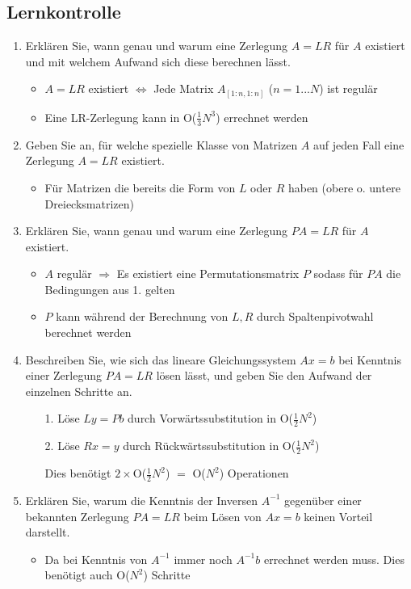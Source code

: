 \documentclass[]{article}
\begin{document}
\subsection{Lernkontrolle}
	\begin{enumerate}
		\item Erklären Sie, wann genau und warum eine Zerlegung $A=LR$ für $A$ existiert und mit welchem Aufwand sich diese berechnen lässt.
			\begin{itemize}
				\item $A = LR$ existiert $\Leftrightarrow$ Jede Matrix $A_{[1:n,1:n]}$ ($n = 1...N$) ist regulär
				\item Eine LR-Zerlegung kann in O($\frac{1}{3} N^3$) errechnet werden
			\end{itemize}
		\item Geben Sie an, für welche spezielle Klasse von Matrizen $A$ auf jeden Fall eine Zerlegung $A=LR$ existiert.
			\begin{itemize}
				\item Für Matrizen die bereits die Form von $L$ oder $R$ haben (obere o. untere Dreiecksmatrizen)
			\end{itemize}
		\item Erklären Sie, wann genau und warum eine Zerlegung $PA=LR$ für $A$ existiert.
			\begin{itemize}
				\item $A$ regulär $\Rightarrow$ Es existiert eine Permutationsmatrix $P$ sodass für $PA$ die Bedingungen aus 1. gelten
				\item $P$ kann während der Berechnung von $L, R$ durch Spaltenpivotwahl berechnet werden
			\end{itemize}
		\item Beschreiben Sie, wie sich das lineare Gleichungssystem $Ax=b$ bei Kenntnis einer Zerlegung $PA=LR$ lösen lässt, und geben Sie den Aufwand der einzelnen Schritte an.
			\begin{enumerate}
				\item[1.] Löse $Ly = Pb$ durch Vorwärtssubstitution in O($\frac{1}{2} N^2$)
				\item[2.] Löse $Rx = y$ durch Rückwärtssubstitution in O($\frac{1}{2} N^2$)
				\item[  ] Dies benötigt $2 \times$O($\frac{1}{2} N^2$) $=$ O($N^2$) Operationen
			\end{enumerate}
		\item Erklären Sie, warum die Kenntnis der Inversen $A^{-1}$ gegenüber einer bekannten Zerlegung $PA = LR$ beim Lösen von $Ax = b$ keinen Vorteil darstellt.
			\begin{itemize}
				\item Da bei Kenntnis von $A^{-1}$ immer noch $A^{-1} b$ errechnet werden muss. Dies benötigt auch O($N^2$) Schritte
			\end{itemize}
	\end{enumerate}
\end{document}
